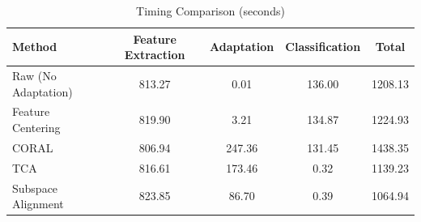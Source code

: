 \begin{table}[htbp]
\centering
\caption{Timing Comparison (seconds)}
\label{tab:timing}
\begin{tabular}{lcccc}
\toprule
Method & Feature Extraction & Adaptation & Classification & Total \\
\midrule
Raw (No Adaptation) & 813.27 & 0.01 & 136.00 & 1208.13 \\
Feature Centering & 819.90 & 3.21 & 134.87 & 1224.93 \\
CORAL & 806.94 & 247.36 & 131.45 & 1438.35 \\
TCA & 816.61 & 173.46 & 0.32 & 1139.23 \\
Subspace Alignment & 823.85 & 86.70 & 0.39 & 1064.94 \\
\bottomrule
\end{tabular}
\end{table}